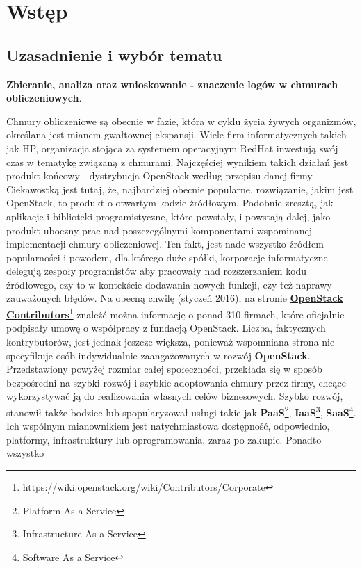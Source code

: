 \chapter[Wstęp]{Wstęp}
\label{chapter:introduction}

\section{Uzasadnienie i wybór tematu}

\textbf{Zbieranie, analiza oraz wnioskowanie - znaczenie logów w chmurach obliczeniowych}. 

Chmury obliczeniowe są obecnie w fazie, która w cyklu życia żywych organizmów, określana jest mianem gwałtownej ekspansji. Wiele firm
informatycznych takich jak HP, organizacja stojąca za systemem operacyjnym RedHat inwestują swój czas w tematykę związaną z chmurami.
Najczęściej wynikiem takich działań jest produkt końcowy - dystrybucja OpenStack według przepisu danej firmy. Ciekawostką jest tutaj,
że, najbardziej obecnie popularne, rozwiązanie, jakim jest OpenStack, to produkt o otwartym kodzie źródłowym. Podobnie zresztą, jak
aplikacje i biblioteki programistyczne, które powstały, i powstają dalej, jako produkt uboczny prac nad poszczególnymi komponentami
wspominanej implementacji chmury obliczeniowej. Ten fakt, jest nade wszystko źródłem popularności i powodem, dla którego duże spółki, 
korporacje informatyczne delegują zespoły programistów aby pracowały nad rozszerzaniem kodu źródłowego, czy to w kontekście
dodawania nowych funkcji, czy też naprawy zauważonych błędów. Na obecną chwilę (styczeń 2016), na stronie \href{https://wiki.openstack.org/wiki/Contributors/Corporate}{\textbf{OpenStack Contributors}}\footnote{https://wiki.openstack.org/wiki/Contributors/Corporate}
znaleźć można informację o ponad 310 firmach, które oficjalnie podpisały umowę o współpracy z fundacją OpenStack. Liczba, faktycznych kontrybutorów,
jest jednak jeszcze większa, ponieważ wspomniana strona nie specyfikuje osób indywidualnie zaangażowanych w rozwój \textbf{OpenStack}.
Przedstawiony powyżej rozmiar całej społeczności, przekłada się w sposób bezpośredni na szybki rozwój i szybkie adoptowania chmury przez firmy, chcące wykorzystywać ją do realizowania własnych celów biznesowych. Szybko rozwój, stanowił także bodziec lub spopularyzował usługi takie jak
\textbf{PaaS}\footnote{Platform As a Service},
\textbf{IaaS}\footnote{Infrastructure As a Service},
\textbf{SaaS}\footnote{Software As a Service}.
Ich wspólnym mianownikiem jest natychmiastowa dostępność, odpowiednio, platformy, infrastruktury lub oprogramowania, zaraz po zakupie. Ponadto wszystko
